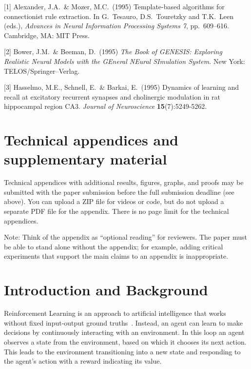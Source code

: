 \documentclass{article}
\begin{document}
{
\small


[1] Alexander, J.A.\ \& Mozer, M.C.\ (1995) Template-based algorithms for
connectionist rule extraction. In G.\ Tesauro, D.S.\ Touretzky and T.K.\ Leen
(eds.), {\it Advances in Neural Information Processing Systems 7},
pp.\ 609--616. Cambridge, MA: MIT Press.


[2] Bower, J.M.\ \& Beeman, D.\ (1995) {\it The Book of GENESIS: Exploring
  Realistic Neural Models with the GEneral NEural SImulation System.}  New York:
TELOS/Springer--Verlag.


[3] Hasselmo, M.E., Schnell, E.\ \& Barkai, E.\ (1995) Dynamics of learning and
recall at excitatory recurrent synapses and cholinergic modulation in rat
hippocampal region CA3. {\it Journal of Neuroscience} {\bf 15}(7):5249-5262.
}



\appendix

\section{Technical appendices and supplementary material}
Technical appendices with additional results, figures, graphs, and proofs may be submitted with the paper submission before the full submission deadline (see above). You can upload a ZIP file for videos or code, but do not upload a separate PDF file for the appendix. There is no page limit for the technical appendices. 

Note: Think of the appendix as ``optional reading'' for reviewers. The paper must be able to stand alone without the appendix; for example, adding critical experiments that support the main claims to an appendix is inappropriate. 


\fi

\section{Introduction and Background}

Reinforcement Learning is an approach to artificial intelligence that works without fixed input-output ground truths~\citep{sutton2018rl}. Instead, an agent can learn to make decisions by continuously interacting with an environment.
In this loop an agent observes a state from the environment, based on which it chooses its next action. This leads to the environment transitioning into a new state and responding to the agent's action
with a reward indicating its value.
\end{document}

